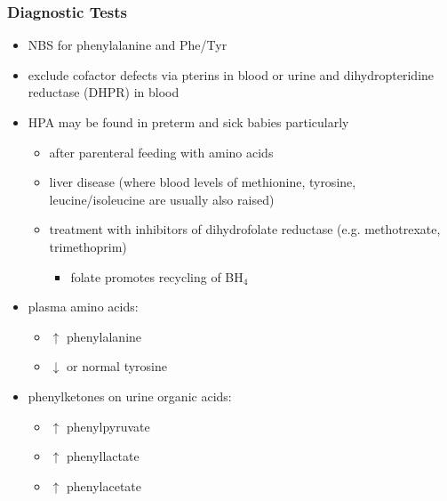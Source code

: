 \documentclass{scrartcl}
\begin{document}
\subsubsection{Diagnostic Tests}
\label{sec:orgd6ac8e6}
\begin{itemize}
\item NBS for phenylalanine and Phe/Tyr
\item exclude cofactor defects via pterins in blood or urine and
dihydropteridine reductase (DHPR) in blood
\item HPA may be found in preterm and sick babies particularly
\begin{itemize}
\item after parenteral feeding with amino acids
\item liver disease (where blood levels of methionine, tyrosine,
leucine/isoleucine are usually also raised)
\item treatment with inhibitors of dihydrofolate reductase (e.g. methotrexate, trimethoprim)
\begin{itemize}
\item folate promotes recycling of BH\(_{\text{4}}\)
\end{itemize}
\end{itemize}
\item plasma amino acids:
\begin{itemize}
\item \(\uparrow\) phenylalanine
\item \(\downarrow\) or normal tyrosine
\end{itemize}
\item phenylketones on urine organic acids:
\begin{itemize}
\item \(\uparrow\) phenylpyruvate
\item \(\uparrow\) phenyllactate
\item \(\uparrow\) phenylacetate
\end{itemize}
\end{itemize}
\end{document}
